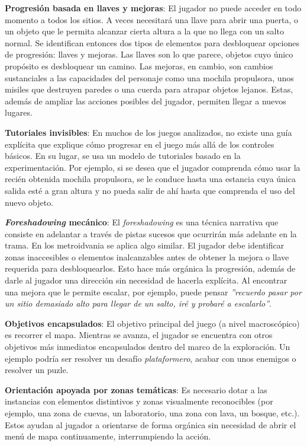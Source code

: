 \textbf{Progresión basada en llaves y mejoras}: El jugador no puede acceder en todo momento a todos los sitios. A veces necesitará una llave para abrir una puerta, o un objeto que le permita alcanzar cierta altura a la que no llega con un salto normal. Se identifican entonces dos tipos de elementos para desbloquear opciones de progresión: llaves y mejoras. Las llaves son lo que parece, objetos cuyo único propósito es desbloquear un camino. Las mejoras, en cambio, son cambios sustanciales a las capacidades del personaje como una mochila propulsora, unos misiles que destruyen paredes o una cuerda para atrapar objetos lejanos. Estas, además de ampliar las acciones posibles del jugador, permiten llegar a nuevos lugares.


\textbf{Tutoriales invisibles}: En muchos de los juegos analizados, no existe una guía explícita que explique cómo progresar en el juego más allá de los controles básicos. En su lugar, se usa un modelo de tutoriales basado en la experimentación. Por ejemplo, si se desea que el jugador comprenda cómo usar la recién obtenida mochila propulsora, se le conduce hasta una estancia cuya única salida esté a gran altura y no pueda salir de ahí hasta que comprenda el uso del nuevo objeto.


\textbf{\textit{Foreshadowing} mecánico}: El \textit{foreshadowing} es una técnica narrativa que consiste en adelantar a través de pistas sucesos que ocurrirán más adelante en la trama. En los metroidvania se aplica algo similar. El jugador debe identificar zonas inaccesibles o elementos inalcanzables antes de obtener la mejora o llave requerida para desbloquearlos. Esto hace más orgánica la progresión, además de darle al jugador una dirección sin necesidad de hacerla explícita. Al encontrar una mejora que le permite escalar, por ejemplo, puede pensar \textit{''recuerdo pasar por un sitio demasiado alto para llegar de un salto, iré y probaré a escalarlo''}.


\textbf{Objetivos encapsulados}: El objetivo principal del juego (a nivel macroscópico) es recorrer el mapa. Mientras se avanza, el jugador se encuentra con otros objetivos más inmediatos encapsulados dentro del marco de la exploración. Un ejemplo podría ser resolver un desafío \textit{plataformero}, acabar con unos enemigos o resolver un puzle. 


\textbf{Orientación apoyada por zonas temáticas}: Es necesario dotar a las instancias con elementos distintivos y zonas visualmente reconocibles (por ejemplo, una zona de cuevas, un laboratorio, una zona con lava, un bosque, etc.). Estos ayudan al jugador a orientarse de forma orgánica sin necesidad de abrir el menú de mapa continuamente, interrumpiendo la acción.

